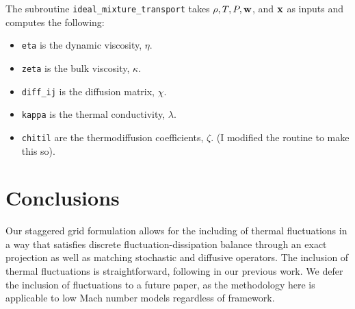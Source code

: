 \documentclass[final]{siamltex}
\def\wb {{\bf w}}
\def\xb {{\bf x}}
\begin{document}
The subroutine {\tt ideal\_mixture\_transport} takes $\rho,T,P,\wb$, and $\xb$ 
as inputs and computes the following:\\
\begin{itemize}

\item {\tt eta} is the dynamic viscosity, $\eta$.\\

\item {\tt zeta} is the bulk viscosity, $\kappa$.\\

\item {\tt diff\_ij} is the diffusion matrix, $\chi$.\\

\item {\tt kappa} is the thermal conductivity, $\lambda$.\\

\item {\tt chitil} are the thermodiffusion coefficients, $\zeta$.
                   (I modified the routine to make this so).\\

\end{itemize}

\section{Conclusions}

Our staggered grid formulation allows for the including of thermal fluctuations
in a way that satisfies discrete fluctuation-dissipation balance through an
exact projection as well as matching stochastic and diffusive operators.
The inclusion of thermal fluctuations is straightforward, following in our previous work.
We defer the inclusion of fluctuations to a future paper, as
the methodology here is applicable to low Mach number models regardless of framework.



\end{document}
